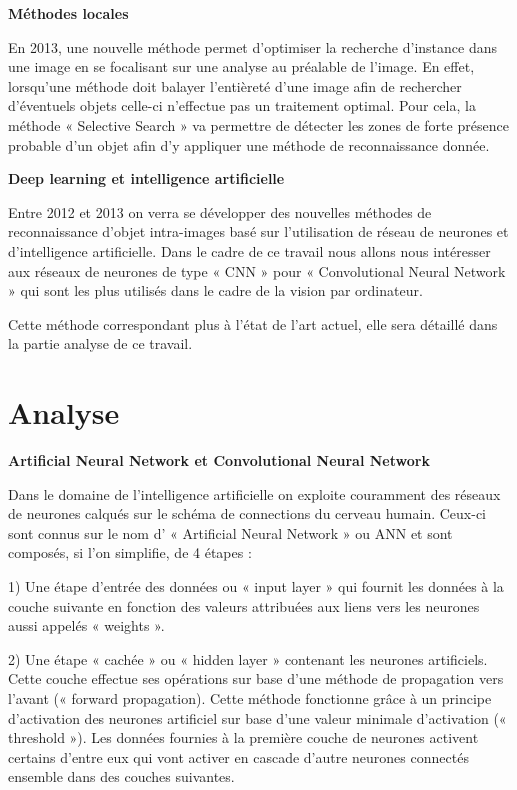 \documentclass[a4paper,12pt]{article} %
\begin{document}
\newpage
\textbf{Méthodes locales}\newline
\par
En 2013, une nouvelle méthode permet d’optimiser la recherche d’instance dans une image en se focalisant sur une analyse au préalable de l’image. En effet, lorsqu’une méthode doit balayer l’entièreté d’une image afin de rechercher d’éventuels objets celle-ci n’effectue pas un traitement optimal. Pour cela, la méthode « Selective Search » va permettre de détecter les zones de forte présence probable d’un objet afin d’y appliquer une méthode de reconnaissance donnée. \newline

\textbf{Deep learning et intelligence artificielle}\newline
\par
Entre 2012 et 2013 on verra se développer des nouvelles méthodes de reconnaissance d’objet intra-images basé sur l’utilisation de réseau de neurones et d’intelligence artificielle. Dans le cadre de ce travail nous allons nous intéresser aux réseaux de neurones de type « CNN » pour « Convolutional Neural Network » qui sont les plus utilisés dans le cadre de la vision par ordinateur.\newline
\par
Cette méthode correspondant plus à l’état de l’art actuel, elle sera détaillé dans la partie analyse de ce travail.  \newline

\newpage
\section{Analyse} %
\newline
\textbf{Artificial Neural Network et Convolutional Neural Network}\newline
\par
Dans le domaine de l’intelligence artificielle on exploite couramment des réseaux de neurones calqués sur le schéma de connections du cerveau humain. Ceux-ci sont connus sur le nom d’ « Artificial Neural Network » ou ANN et sont composés, si l’on simplifie, de 4 étapes :\newline

1)	Une étape d’entrée des données ou « input layer » qui fournit les données à la couche suivante en fonction des valeurs attribuées aux liens vers les neurones aussi appelés « weights ».\newline

2)	Une étape « cachée » ou « hidden layer » contenant les neurones artificiels. Cette couche effectue ses opérations sur base d’une méthode de propagation vers l’avant (« forward propagation). Cette méthode fonctionne grâce à un principe d’activation des neurones artificiel sur base d’une valeur minimale d’activation (« threshold »). Les données fournies à la première couche de neurones activent certains d’entre eux qui vont activer en cascade d’autre neurones connectés ensemble dans des couches suivantes.\newline
\end{document}
